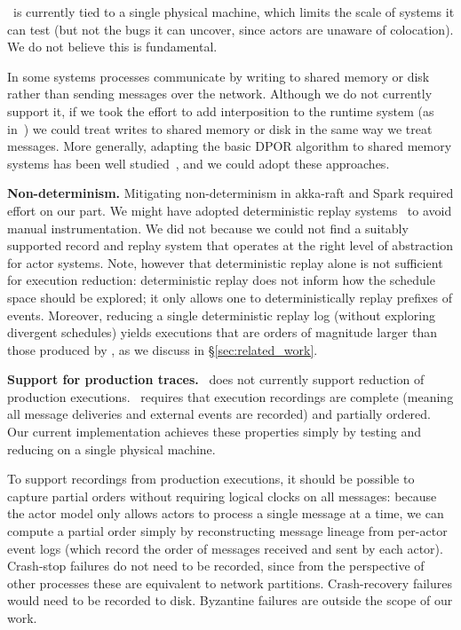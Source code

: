  \sys~is currently tied to a
single physical machine, which limits the scale of systems it can test (but
not the bugs it can uncover, since actors are unaware of colocation). We do not
believe this is fundamental.

 In some systems processes communicate
by writing to
shared memory or disk rather than sending messages over the network.
Although we do not currently support it, if we took the effort to add interposition to the
runtime system (as in~\cite{tallam2007enabling}) we could treat writes to shared memory or
disk in the same way we treat messages. More generally, adapting the
basic DPOR algorithm to shared memory systems has been well
studied~\cite{yabandeh2009dpor,flanagan2005dynamic}, and we could adopt these approaches.

\noindent\textbf{Non-determinism.} Mitigating non-determinism in akka-raft and
Spark required effort on our part. We might have adopted deterministic replay
systems~\cite{Dunlap:2002:REI:844128.844148,Geels:2006:RDD:1267359.1267386,lin2013defined,Zamfir:2010:EST:1755913.1755946}
to avoid manual instrumentation. We did not because we could not
find a suitably supported record and replay system that operates at the right
level of abstraction for actor systems.
Note, however that
deterministic replay alone is not sufficient for execution reduction:
deterministic replay does not inform how the schedule space should be
explored; it only allows one to deterministically replay prefixes of events.
Moreover, reducing a single deterministic replay log (without exploring divergent
schedules) yields executions that are orders of magnitude larger
than those produced by \sys, as we discuss in
\S\ref{sec:related_work}.

\noindent\textbf{Support for production traces.} \sys~does not currently
support reduction of production executions.
\sys~requires that execution recordings are complete (meaning all message
deliveries and external events are recorded) and partially ordered. Our
current implementation
achieves these properties simply by testing and reducing on a single
physical machine.

To support recordings from production executions, it should be possible to
capture partial orders without requiring logical clocks on all messages:
because the actor model only allows actors to process a
single message at a time, we can compute a partial order simply by
reconstructing message lineage from per-actor event logs (which record the order
of messages received and sent by each actor).
Crash-stop
failures do not need to be recorded, since from the perspective of other
processes these are equivalent to network partitions. Crash-recovery failures
would need to be recorded to disk. Byzantine failures are outside the scope of
our work.


